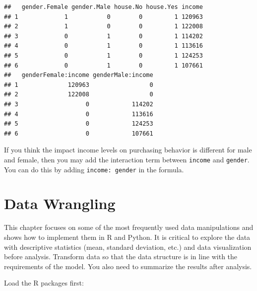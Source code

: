 \documentclass[12pt,]{krantz}
\makeatletter
\newenvironment{Shaded}{\begin{snugshade}}{\end{snugshade}}
\newcommand{\CommentTok}[1]{\textcolor[rgb]{0.37,0.37,0.37}{\textit{#1}}}
\newcommand{\ControlFlowTok}[1]{\textcolor[rgb]{0.27,0.27,0.27}{\textbf{#1}}}
\newcommand{\DataTypeTok}[1]{\textcolor[rgb]{0.27,0.27,0.27}{#1}}
\newcommand{\DecValTok}[1]{\textcolor[rgb]{0.06,0.06,0.06}{#1}}
\newcommand{\KeywordTok}[1]{\textcolor[rgb]{0.27,0.27,0.27}{\textbf{#1}}}
\newcommand{\NormalTok}[1]{#1}
\newcommand{\OperatorTok}[1]{\textcolor[rgb]{0.43,0.43,0.43}{\textbf{#1}}}
\newcommand{\OtherTok}[1]{\textcolor[rgb]{0.37,0.37,0.37}{#1}}
\newcommand{\StringTok}[1]{\textcolor[rgb]{0.5,0.5,0.5}{#1}}
\newenvironment{kframe}{%
\medskip{}
\setlength{\fboxsep}{.8em}
 \def\at@end@of@kframe{}%
 \ifinner\ifhmode%
  \def\at@end@of@kframe{\end{minipage}}%
  \begin{minipage}{\columnwidth}%
 \fi\fi%
 \def\FrameCommand##1{\hskip\@totalleftmargin \hskip-\fboxsep
 \colorbox{shadecolor}{##1}\hskip-\fboxsep
     \hskip-\linewidth \hskip-\@totalleftmargin \hskip\columnwidth}%
 \MakeFramed {\advance\hsize-\width
   \@totalleftmargin\z@ \linewidth\hsize
   \@setminipage}}%
 {\par\unskip\endMakeFramed%
 \at@end@of@kframe}
\renewenvironment{Shaded}{\begin{kframe}}{\end{kframe}}
\makeatother
\begin{document}
\begin{verbatim}
##   gender.Female gender.Male house.No house.Yes income
## 1             1           0        0         1 120963
## 2             1           0        0         1 122008
## 3             0           1        0         1 114202
## 4             0           1        0         1 113616
## 5             0           1        0         1 124253
## 6             0           1        0         1 107661
##   genderFemale:income genderMale:income
## 1              120963                 0
## 2              122008                 0
## 3                   0            114202
## 4                   0            113616
## 5                   0            124253
## 6                   0            107661
\end{verbatim}

If you think the impact income levels on purchasing behavior is different for male and female, then you may add the interaction term between \texttt{income} and \texttt{gender}. You can do this by adding \texttt{income:\ gender} in the formula.

\hypertarget{data-wrangling}{%
\chapter{Data Wrangling}\label{data-wrangling}}

This chapter focuses on some of the most frequently used data manipulations and shows how to implement them in R and Python. It is critical to explore the data with descriptive statistics (mean, standard deviation, etc.) and data visualization before analysis. Transform data so that the data structure is in line with the requirements of the model. You also need to summarize the results after analysis.

Load the R packages first:

\begin{Shaded}
\end{Shaded}
\end{document}
